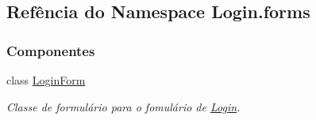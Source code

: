 \hypertarget{namespaceLogin_1_1forms}{}\subsection{Refência do Namespace Login.\+forms}
\label{namespaceLogin_1_1forms}
\subsubsection*{Componentes}
\begin{DoxyCompactItemize}
\item 
class \hyperlink{classLogin_1_1forms_1_1LoginForm}{Login\+Form}
\begin{DoxyCompactList}\small\item\em Classe de formulário para o fomulário de \hyperlink{namespaceLogin}{Login}. \end{DoxyCompactList}\end{DoxyCompactItemize}

